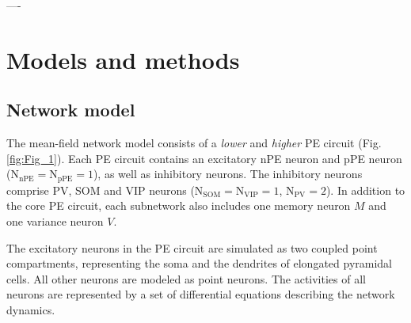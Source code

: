 \documentclass[10pt,a4paper,draft]{article}
\begin{document}


----




\section*{Models and methods}
%
\subsection*{Network model}
The mean-field network model consists of a \textit{lower} and \textit{higher} PE circuit (Fig. \ref{fig:Fig_1}). Each PE circuit contains an excitatory nPE neuron and pPE neuron ($\mathrm{N}_\mathrm{nPE} = \mathrm{N}_\mathrm{pPE} = 1$), as well as inhibitory neurons. The inhibitory neurons comprise PV, SOM and VIP neurons ($\mathrm{N}_\mathrm{SOM} = \mathrm{N}_\mathrm{VIP} = 1$, $\mathrm{N}_\mathrm{PV} = 2$). In addition to the core PE circuit, each subnetwork also includes one memory neuron $M$ and one variance neuron $V$. 

The excitatory neurons in the PE circuit are simulated as two coupled point compartments, representing the soma and the dendrites of elongated pyramidal cells. All other neurons are modeled as point neurons. The activities of all neurons are represented by a set of differential equations describing the network dynamics. 
\end{document}
